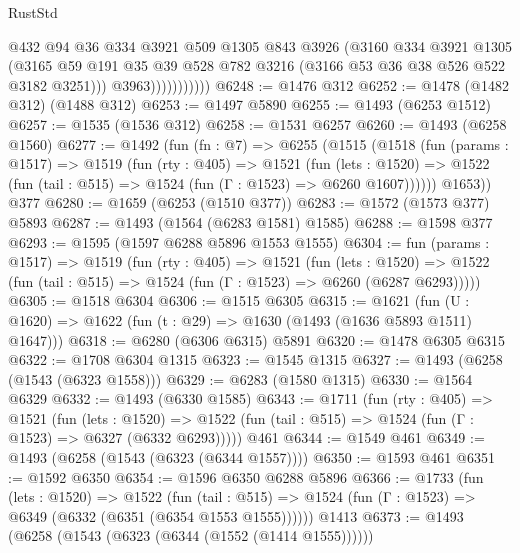 \begin{lexlean}{RustStd}
\begin{coremodule}
                          @432
                          @94
                          @36
                          @334
                          @3921
                          @509
                          @1305
                          @843
                          @3926
                          (@3160
                            @334
                            @3921
                            @1305
                            (@3165
                              @59
                              @191
                              @35
                              @39
                              @528
                              @782
                              @3216
                              (@3166 @53 @36 @38 @526 @522 @3182 @3251)))
                          @3963)))))))))))
@6248 := @1476 @312
@6252 := @1478 (@1482 @312) (@1488 @312)
@6253 := @1497 @5890
@6255 := @1493 (@6253 @1512)
@6257 := @1535 (@1536 @312)
@6258 := @1531 @6257
@6260 := @1493 (@6258 @1560)
@6277 := @1492
    (fun (fn : @7) =>
    @6255
      (@1515
        (@1518
          (fun (params : @1517) =>
          @1519
            (fun (rty : @405) =>
            @1521
              (fun (lets : @1520) =>
              @1522 (fun (tail : @515) => @1524 (fun (Γ : @1523) => @6260 @1607))))))
        @1653))
    @377
@6280 := @1659 (@6253 (@1510 @377))
@6283 := @1572 (@1573 @377) @5893
@6287 := @1493 (@1564 (@6283 @1581) @1585)
@6288 := @1598 @377
@6293 := @1595 (@1597 @6288 @5896 @1553 @1555)
@6304 := fun (params : @1517) =>
  @1519
    (fun (rty : @405) =>
    @1521
      (fun (lets : @1520) =>
      @1522 (fun (tail : @515) => @1524 (fun (Γ : @1523) => @6260 (@6287 @6293)))))
@6305 := @1518 @6304
@6306 := @1515 @6305
@6315 := @1621 (fun (U : @1620) => @1622 (fun (t : @29) => @1630 (@1493 (@1636 @5893 @1511) @1647)))
@6318 := @6280 (@6306 @6315) @5891
@6320 := @1478 @6305 @6315
@6322 := @1708 @6304 @1315
@6323 := @1545 @1315
@6327 := @1493 (@6258 (@1543 (@6323 @1558)))
@6329 := @6283 (@1580 @1315)
@6330 := @1564 @6329
@6332 := @1493 (@6330 @1585)
@6343 := @1711
    (fun (rty : @405) =>
    @1521
      (fun (lets : @1520) =>
      @1522 (fun (tail : @515) => @1524 (fun (Γ : @1523) => @6327 (@6332 @6293)))))
    @461
@6344 := @1549 @461
@6349 := @1493 (@6258 (@1543 (@6323 (@6344 @1557))))
@6350 := @1593 @461
@6351 := @1592 @6350
@6354 := @1596 @6350 @6288 @5896
@6366 := @1733
    (fun (lets : @1520) =>
    @1522
      (fun (tail : @515) => @1524 (fun (Γ : @1523) => @6349 (@6332 (@6351 (@6354 @1553 @1555))))))
    @1413
@6373 := @1493 (@6258 (@1543 (@6323 (@6344 (@1552 (@1414 @1555))))))

\end{coremodule}
\end{lexlean}
